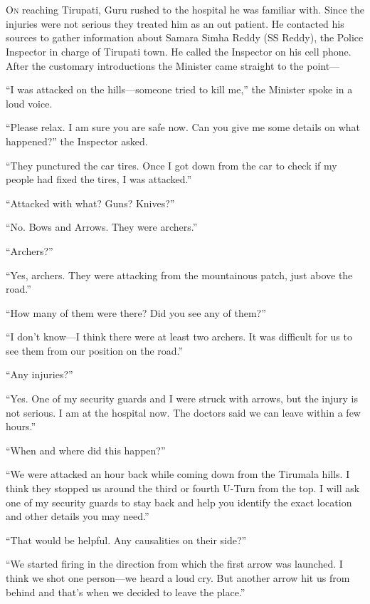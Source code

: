 \chapter{}

\lettrine{O}{n} reaching Tirupati, Guru rushed to the hospital he was familiar with. Since
the injuries were not serious they treated him as an out patient. He contacted
his sources to gather information about Samara Simha Reddy (SS Reddy), the
Police Inspector in charge of Tirupati town. He called the Inspector on his cell
phone. After the customary introductions the Minister came straight to the point—

“I was attacked on the hills—someone tried to kill me,” the Minister spoke in
a loud voice.

“Please relax. I am sure you are safe now. Can you give me some details on what
happened?” the Inspector asked.

“They punctured the car tires. Once I got down from the car to check if my
people had fixed the tires, I was attacked.”

“Attacked with what? Guns? Knives?”

“No. Bows and Arrows. They were archers.”

“Archers?”

“Yes, archers. They were attacking from the mountainous patch, just above the
road.”

“How many of them were there? Did you see any of them?”

“I don't know—I think there were at least two archers. It was difficult for us
to see them from our position on the road.”

“Any injuries?”

“Yes. One of my security guards and I were struck with arrows, but the injury is
not serious. I am at the hospital now. The doctors said we can leave within a
few hours.”

“When and where did this happen?”

“We were attacked an hour back while coming down from the Tirumala hills. I
think they stopped us around the third or fourth U-Turn from the top. I will ask
one of my security guards to stay back and help you identify the exact location
and other details you may need.”

“That would be helpful. Any causalities on their side?”

“We started firing in the direction from which the first arrow was launched. I
think we shot one person—we heard a loud cry. But another arrow hit us from
behind and that's when we decided to leave the place.”

